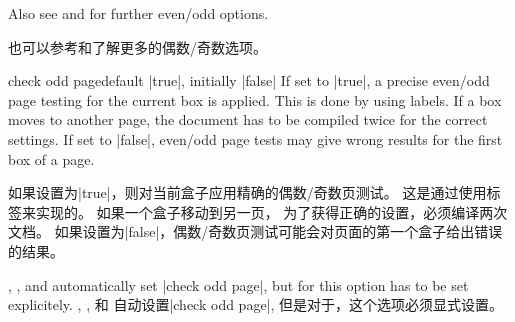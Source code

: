 
\begin{marker}
Also see  and  for further even/odd options.

也可以参考和了解更多的偶数/奇数选项。
\end{marker}

\begin{docTcbKey}[][doc updated=2015-11-13]{check odd page}{}{default |true|, initially |false|}
If set to |true|, a precise even/odd page testing for the current box is applied. 
This is done by using labels. If a box moves to another page,
the document has to be compiled twice for the correct settings.
If set to |false|, even/odd page tests may give wrong results for the first box of a page.


如果设置为|true|，则对当前盒子应用精确的偶数/奇数页测试。%
这是通过使用标签来实现的。%
如果一个盒子移动到另一页，%
为了获得正确的设置，必须编译两次文档。%
如果设置为|false|，偶数/奇数页测试可能会对页面的第一个盒子给出错误的结果。

 ,
 , and
 automatically set |check odd page|, but for
  this option has to be set explicitely.
,
, 和
自动设置|check odd page|, 但是对于，这个选项必须显式设置。
\end{docTcbKey}


